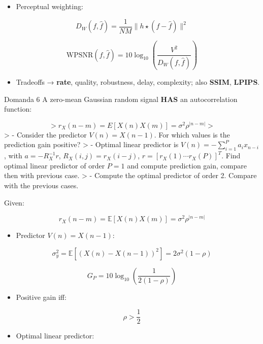 \begin{itemize}
  \item Perceptual weighting:
\end{itemize}


$$
D_W(f,\hat{f}) = \frac{1}{NM}\|h \star (f-\hat{f})\|^2
$$



$$
\text{WPSNR}(f,\hat{f}) = 10\log_{10}\left(\frac{V^2}{D_W(f,\hat{f})}\right)
$$


\begin{itemize}
  \item Tradeoffs → \textbf{rate}, quality, robustness, delay, complexity; also \textbf{SSIM}, \textbf{LPIPS}.
\end{itemize}



\begin{questionbox}{Domanda 6}
A zero-mean Gaussian random signal \textbf{HAS} an autocorrelation function:
\end{questionbox}

$$
> r_X(n-m)=E[X(n)X(m)] = \sigma^2\rho^{|n-m|}
> $$
> - Consider the predictor $V(n)=X(n-1)$. For which values is the prediction gain positive?
> - Optimal linear predictor is $V(n)=-\sum_{i=1}^{P} a_i x_{n-i}$, with $a=-R_X^{-1}r$, $R_X(i,j)=r_X(i-j)$, $r=[r_X(1)\cdots r_X(P)]^T$. Find optimal linear predictor of order $P=1$ and compute prediction gain, compare then with previous case.
> - Compute the optimal predictor of order 2. Compare with the previous cases.

Given:


$$
r_X(n-m)=\mathbb{E}[X(n)X(m)] = \sigma^2\rho^{|n-m|}
$$


\begin{itemize}
  \item Predictor $V(n)=X(n-1)$:
\end{itemize}


$$
\sigma_y^2 = \mathbb{E}[(X(n)-X(n-1))^2] = 2\sigma^2(1-\rho)
$$



$$
G_P = 10\log_{10}\left(\frac{1}{2(1-\rho)}\right)
$$


\begin{itemize}
  \item Positive gain iff:
\end{itemize}


$$
\rho > \frac{1}{2}
$$


\begin{itemize}
  \item Optimal linear predictor:
\end{itemize}


